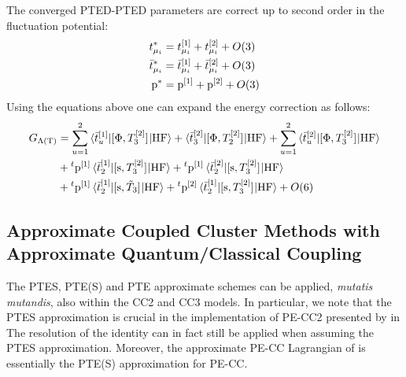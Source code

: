 The converged \acrshort{PTED}-\acrshort{PTED} parameters are correct up
to second order in the fluctuation potential:
\begin{subequations}
  \begin{align}
    t_{\mu_i}^{*} &= t_{\mu_i}^{[1]} + t_{\mu_i}^{[2]} + O(3)
    \label{eq:tamp-star} \\
    \bar{t}_{\mu_i}^{*} &= \bar{t}_{\mu_i}^{[1]} + \bar{t}_{\mu_i}^{[2]} + O(3)
    \label{eq:tbar-star} \\
    \mathrm{p}^{*} &= \mathrm{p}^{[1]} + \mathrm{p}^{[2]} + O(3)
    \label{eq:p-star}
  \end{align}
\end{subequations}
Using the equations above one can expand the energy correction as
follows:
\begin{equation}
  \begin{aligned}
  G_{\Lambda(\text{T})} &=
  \sum_{u=1}^2 \braket{\bar{t}_{u}^{[1]} | [ \Phi, T_3^{[2]} ]^{} | \mathrm{HF}}
  +
  \braket{\bar{t}_{3}^{[2]} | [ \Phi, T_2^{[2]} ]^{} | \mathrm{HF}}
  +
  \sum_{u=1}^2 \braket{\bar{t}_{u}^{[2]} | [ \Phi, T_3^{[2]} ]^{} | \mathrm{HF}}
  \\
  &+
  {}^t\mathrm{p}^{[1]} \braket{\bar{t}_{2}^{[1]} | [ \mathrm{s}, T_3^{[2]} ]^{} | \mathrm{HF}}
  +
  {}^t\mathrm{p}^{[1]} \braket{\bar{t}_{2}^{[2]} | [ \mathrm{s}, T_3^{[2]} ]^{} | \mathrm{HF}}
   \\
  &+
  {}^t\mathrm{p}^{[1]} \braket{\bar{t}_{2}^{[1]} | [ \mathrm{s}, \tilde{T}_3 ]^{} | \mathrm{HF}}
  +
  {}^t\mathrm{p}^{[2]} \braket{\bar{t}_{2}^{[1]} | [ \mathrm{s}, T_3^{[2]} ]^{} | \mathrm{HF}}
  + O(6)
  \end{aligned}
\end{equation}

\subsection{Approximate Coupled Cluster Methods with Approximate
Quantum/Classical Coupling}\label{sec:approximate-everything}


The \acrshort{PTES}, \acrshort{PTE(S)} and \acrshort{PTE} approximate
schemes can be applied, \emph{mutatis mutandis}, also within the
\acrshort{CC2} and \acrshort{CC3} models.\autocite{Caricato2011-tx, Schwabe2012-cf, Krause2016-ee}
In particular, we note that the \acrshort{PTES} approximation is crucial
in the implementation of \acrshort{PE}-\acrshort{CC2} presented by
\citeauthor{Schwabe2012-cf} in 
The resolution of the identity can in fact still be applied when
assuming the \acrshort{PTES} approximation.
Moreover, the approximate \acrshort{PE}-\acrshort{CC} Lagrangian of
\citeauthor{Krause2016-ee} is essentially the \acrshort{PTE(S)}
approximation for \acrshort{PE}-\acrshort{CC}.\autocite{Krause2016-ee}
